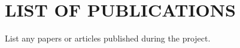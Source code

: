\chapter{LIST OF PUBLICATIONS}
\label{ch:publications}

List any papers or articles published during the project.
